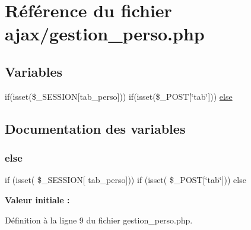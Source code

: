 \hypertarget{gestion__perso_8php}{}\section{Référence du fichier ajax/gestion\+\_\+perso.php}
\label{gestion__perso_8php}
\subsection*{Variables}
\begin{DoxyCompactItemize}
\item 
if(isset(\$\+\_\+\+S\+E\+S\+S\+I\+ON\mbox{[}\textquotesingle{}tab\+\_\+perso\textquotesingle{}\mbox{]})) if(isset(\$\+\_\+\+P\+O\+ST\mbox{[}\char`\"{}tab\char`\"{}\mbox{]})) \mbox{\hyperlink{gestion__perso_8php_a467fb87dd181c3adef01f7b4a3797207}{else}}
\end{DoxyCompactItemize}


\subsection{Documentation des variables}
\mbox{\label{gestion__perso_8php_a467fb87dd181c3adef01f7b4a3797207}} 
\subsubsection{\texorpdfstring{else}{else}}
{\footnotesize\ttfamily if (isset( \$\+\_\+\+S\+E\+S\+S\+I\+ON\mbox{[} \textquotesingle{}tab\+\_\+perso\textquotesingle{}\mbox{]})) if (isset( \$\+\_\+\+P\+O\+ST\mbox{[}\char`\"{}tab\char`\"{}\mbox{]})) else}

{\bfseries Valeur initiale \+:}


Définition à la ligne 9 du fichier gestion\+\_\+perso.\+php.

